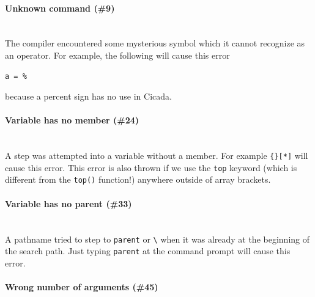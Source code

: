 \documentclass{article}
\newenvironment{code}{
       \begin{list}{}{
               \setlength{\leftmargin}{.4in}
               \setlength{\rightmargin}{0in}
               \setlength{\topsep}{.2in}
       }
       \small
       \item[] }
       { \end{list}   }
\begin{document}
\paragraph{Unknown command (\#9)\\\\}

The compiler encountered some mysterious symbol which it cannot recognize as an operator.  For example, the following will cause this error

\begin{code} \begin{verbatim}
a = %
\end{verbatim} \end{code}

\noindent because a percent sign has no use in Cicada.\\




\paragraph{Variable has no member (\#24)\\\\}

A step was attempted into a variable without a member.  For example \verb#{}[*]# will cause this error.  This error is also thrown if we use the \verb#top# keyword (which is different from the \verb#top()# function!) anywhere outside of array brackets.\\




\paragraph{Variable has no parent (\#33)\\\\}

A pathname tried to step to \verb#parent# or \verb#\# when it was already at the beginning of the search path.  Just typing \verb#parent# at the command prompt will cause this error.\\




\paragraph{Wrong number of arguments (\#45)\\\\}
\end{document}
